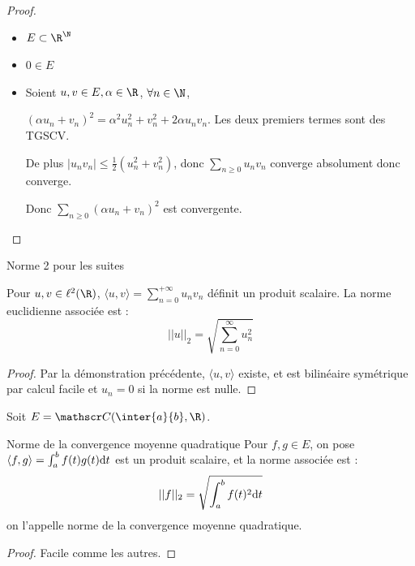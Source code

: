 
\begin{proof}~
    \begin{itemize}
        \item $E \subset \R^{\N}$
        
        \item $0 \in E$

        \item Soient $u, v \in E, \alpha \in \R$, $\forall n \in \N$,
        
        $(\alpha u_n + v_n)^2 = \alpha^2u_n^2 + v_n^2 + 2 \alpha u_n v_n$. Les deux premiers termes sont des TGSCV.

        De plus $|u_n v_n| \leqslant \frac 1 2 (u_n^2 + v_n^2)$, donc $\sum_{n \geqslant 0} u_n v_n$ converge absolument donc converge. 

        Donc $\sum_{n \geqslant 0} (\alpha u_n + v_n)^2$ est convergente. 
    \end{itemize}
\end{proof}

\begin{theoreme}{Norme 2 pour les suites}{}

    Pour $u, v \in \ell^2(\R)$, $\displaystyle \langle u, v \rangle = \sum_{n = 0 }^{+ \infty} u_n v_n$
    définit un produit scalaire. 
    La norme euclidienne associée est : 
    \[||u||_2 = \sqrt{\sum_{n = 0 }^{\infty}u_n^2}\]
\end{theoreme}

\begin{proof}
    Par la démonstration précédente, $\langle u, v \rangle$ existe, et est bilinéaire symétrique par calcul 
    facile et $u_n = 0$ si la norme est nulle. 
\end{proof}

Soit $E = \mathscr C(\inter{a}{b}, \R)$.

\begin{theoreme}{Norme de la convergence moyenne quadratique}{}
    Pour $f, g \in E$, on pose 
    $\langle f, g \rangle = \int_{a}^{b} f(t)g(t) \text d t$
    est un produit scalaire, et la norme associée est :
    \[||f||_2 = \sqrt{\int_{a }^{b } f(t)^2 \text d t}\]
    on l'appelle norme de la convergence moyenne quadratique. 
\end{theoreme}

\begin{proof}
    Facile comme les autres.
\end{proof}

